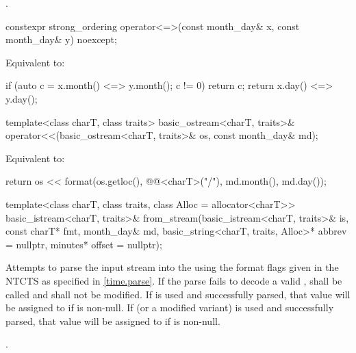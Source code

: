 \begin{itemdescr}
\pnum
\returns
{}.
\end{itemdescr}

%
\begin{itemdecl}
constexpr strong_ordering operator<=>(const month_day& x, const month_day& y) noexcept;
\end{itemdecl}

\begin{itemdescr}
\pnum
\effects
Equivalent to:
\begin{codeblock}
if (auto c = x.month() <=> y.month(); c != 0) return c;
return x.day() <=> y.day();
\end{codeblock}
\end{itemdescr}

%
\begin{itemdecl}
template<class charT, class traits>
  basic_ostream<charT, traits>&
    operator<<(basic_ostream<charT, traits>& os, const month_day& md);
\end{itemdecl}

\begin{itemdescr}
\pnum
\effects
Equivalent to:
\begin{codeblock}
return os << format(os.getloc(), @@<charT>("{}/{}"),
                    md.month(), md.day());
\end{codeblock}
\end{itemdescr}

%
\begin{itemdecl}
template<class charT, class traits, class Alloc = allocator<charT>>
  basic_istream<charT, traits>&
    from_stream(basic_istream<charT, traits>& is, const charT* fmt,
                month_day& md, basic_string<charT, traits, Alloc>* abbrev = nullptr,
                minutes* offset = nullptr);
\end{itemdecl}

\begin{itemdescr}
\pnum
\effects
Attempts to parse the input stream 
into the   using
the format flags given in the NTCTS 
as specified in \ref{time.parse}.
If the parse fails to decode a valid ,
 shall be called
and  shall not be modified.
If  is used and successfully parsed,
that value will be assigned to  if  is non-null.
If  (or a modified variant) is used and successfully parsed,
that value will be assigned to  if  is non-null.

\pnum
\returns
{}.
\end{itemdescr}


